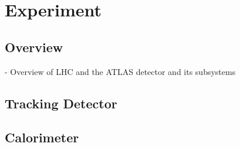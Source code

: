 \chapter{Experiment }


\section{Overview }
{\normalsize - Overview of LHC and the ATLAS detector and its subsystems}


\section{Tracking Detector }


\section{Calorimeter }
